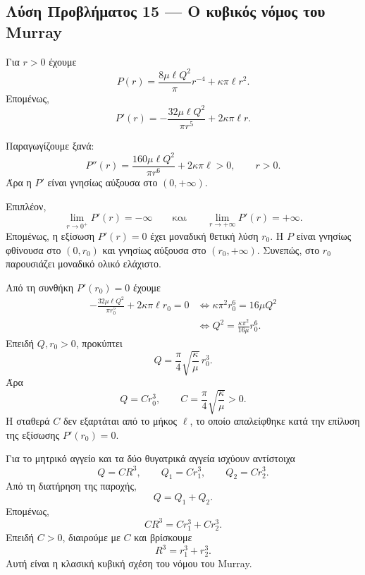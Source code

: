 \subsection*{Λύση Προβλήματος 15 --- Ο κυβικός νόμος του Murray}

\begin{alist}
  \item Για $r>0$ έχουμε
        \[
          P(r)
          =\frac{8\mu\ell Q^2}{\pi}r^{-4}
          +\kappa\pi\ell r^2.
        \]
        Επομένως,
        \[
          {
          P'(r)
          =-\frac{32\mu\ell Q^2}{\pi r^5}
          +2\kappa\pi\ell r}.
        \]

  \item Παραγωγίζουμε ξανά:
        \[
          P''(r)
          =\frac{160\mu\ell Q^2}{\pi r^6}
          +2\kappa\pi\ell>0,
          \qquad r>0.
        \]
        Άρα η $P'$ είναι γνησίως αύξουσα στο $(0,+\infty)$.

        Επιπλέον,
        \[
          \lim_{r\to0^+}P'(r)=-\infty
          \qquad\text{και}\qquad
          \lim_{r\to+\infty}P'(r)=+\infty.
        \]
        Επομένως, η εξίσωση $P'(r)=0$ έχει μοναδική θετική λύση
        $r_0$. Η $P$ είναι γνησίως φθίνουσα στο $(0,r_0)$ και γνησίως
        αύξουσα στο $(r_0,+\infty)$. Συνεπώς, στο $r_0$ παρουσιάζει
        μοναδικό ολικό ελάχιστο.

  \item Από τη συνθήκη $P'(r_0)=0$ έχουμε
        \begin{align*}
          -\frac{32\mu\ell Q^2}{\pi r_0^5}
          +2\kappa\pi\ell r_0=0
          &\Longleftrightarrow
          \kappa\pi^2r_0^6=16\mu Q^2\\
          &\Longleftrightarrow
          Q^2=\frac{\kappa\pi^2}{16\mu}r_0^6.
        \end{align*}
        Επειδή $Q,r_0>0$, προκύπτει
        \[
          Q=\frac{\pi}{4}\sqrt{\frac{\kappa}{\mu}}\,r_0^3.
        \]
        Άρα
        \[
          {Q=Cr_0^3},
          \qquad
          C=\frac{\pi}{4}\sqrt{\frac{\kappa}{\mu}}>0.
        \]
        Η σταθερά $C$ δεν εξαρτάται από το μήκος $\ell$, το οποίο
        απαλείφθηκε κατά την επίλυση της εξίσωσης $P'(r_0)=0$.

  \item Για το μητρικό αγγείο και τα δύο θυγατρικά αγγεία ισχύουν
        αντίστοιχα
        \[
          Q=CR^3,\qquad
          Q_1=Cr_1^3,\qquad
          Q_2=Cr_2^3.
        \]
        Από τη διατήρηση της παροχής,
        \[
          Q=Q_1+Q_2.
        \]
        Επομένως,
        \[
          CR^3=Cr_1^3+Cr_2^3.
        \]
        Επειδή $C>0$, διαιρούμε με $C$ και βρίσκουμε
        \[
          {R^3=r_1^3+r_2^3}.
        \]
        Αυτή είναι η κλασική κυβική σχέση του νόμου του Murray.
\end{alist}
